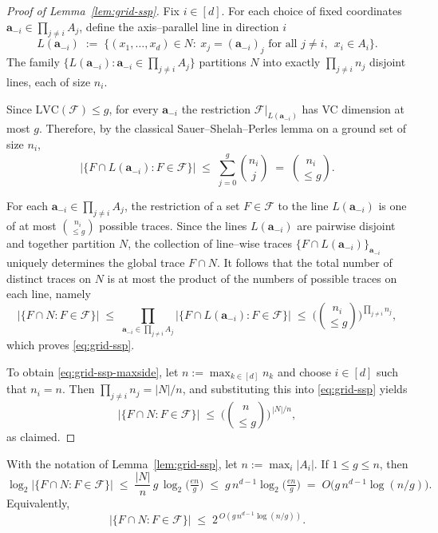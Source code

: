 \documentclass[arxiv]{colt2026}
\newcommand{\F}{\mathcal{F}}
\newcommand{\LVC}{\mathrm{LVC}}
\newcommand{\binomle}[2]{\binom{#1}{\le #2}}
\begin{document}
\begin{proof}[Proof of Lemma~\ref{lem:grid-ssp}]
Fix \(i\in[d]\).
For each choice of fixed coordinates
\(\mathbf{a}_{-i}\in \prod_{j\ne i}A_j\),
define the axis--parallel line in direction \(i\)
\[
L(\mathbf{a}_{-i})
\;:=\;
\{(x_1,\ldots,x_d)\in N:\ x_j=(\mathbf{a}_{-i})_j \text{ for all } j\ne i,\ \ x_i\in A_i\}.
\]
The family \(\{L(\mathbf{a}_{-i}) : \mathbf{a}_{-i}\in \prod_{j\ne i}A_j\}\)
partitions \(N\) into exactly \(\prod_{j\ne i} n_j\) disjoint lines, each of size \(n_i\).

Since \(\LVC(\F)\le g\), for every \(\mathbf{a}_{-i}\) the restriction
\(\F|_{L(\mathbf{a}_{-i})}\) has VC dimension at most \(g\).
Therefore, by the classical Sauer--Shelah--Perles lemma on a ground set of size \(n_i\),
\[
\big|\{F\cap L(\mathbf{a}_{-i}) : F\in\F\}\big|
\;\le\;
\sum_{j=0}^{g}\binom{n_i}{j}
\;=\;
\binomle{n_i}{g}.
\]

For each \(\mathbf{a}_{-i}\in\prod_{j\ne i}A_j\), the restriction of a set
\(F\in\F\) to the line \(L(\mathbf{a}_{-i})\) is one of at most
\(\binomle{n_i}{g}\) possible traces.
Since the lines \(L(\mathbf{a}_{-i})\) are pairwise disjoint and together
partition \(N\), the collection of line--wise traces
\(\{F\cap L(\mathbf{a}_{-i})\}_{\mathbf{a}_{-i}}\) uniquely determines
the global trace \(F\cap N\).
It follows that the total number of distinct traces on \(N\) is at most the
product of the numbers of possible traces on each line, namely
\[
\big|\{F\cap N : F\in\F\}\big|
\;\le\;
\prod_{\mathbf{a}_{-i}\in \prod_{j\ne i}A_j}
\big|\{F\cap L(\mathbf{a}_{-i}) : F\in\F\}\big|
\;\le\;
\bigg(\binomle{n_i}{g}\bigg)^{\prod_{j\ne i}n_j},
\]
which proves \eqref{eq:grid-ssp}.

To obtain \eqref{eq:grid-ssp-maxside}, let \(n:=\max_{k\in[d]} n_k\) and choose
\(i\in[d]\) such that \(n_i=n\).
Then \(\prod_{j\ne i}n_j = |N|/n\), and substituting this into
\eqref{eq:grid-ssp} yields
\[
\big|\{F \cap N : F \in \F\}\big|
\;\le\;
\Big(\binomle{n}{g}\Big)^{\,|N|/n},
\]
as claimed.
\end{proof}

\begin{corollary}
\label{cor:grid-ssp-rate}
With the notation of Lemma~\ref{lem:grid-ssp}, let \(n:=\max_i |A_i|\).
If \(1\le g\le n\), then
\begin{equation}
\label{eq:grid-ssp-rate}
\log_2\big|\{F\cap N:F\in\F\}\big|
\;\le\;
\frac{|N|}{n}\,g\,\log_2\!\Big(\tfrac{en}{g}\Big)
\;\le\;
g\,n^{d-1}\log_2\!\Big(\tfrac{en}{g}\Big)
\;=\;
O\!\bigl(g\,n^{d-1}\log(n/g)\bigr).
\end{equation}
Equivalently,
\[
\big|\{F\cap N:F\in\F\}\big|
\;\le\;
2^{\,O\!\left(g\,n^{d-1}\log(n/g)\right)}.
\]
\end{corollary}
\end{document}
